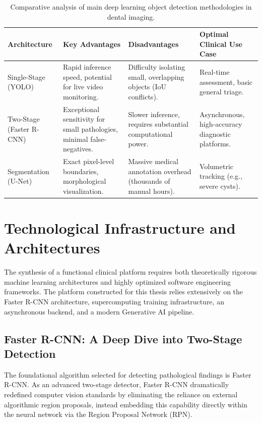 \begin{table}[htbp]
    \centering
    \caption{Comparative analysis of main deep learning object detection methodologies in dental imaging.}
    \vspace{0.2cm}
    \renewcommand{\arraystretch}{1.3}
    \begin{tabular}{|l|>{\raggedright\arraybackslash}p{3.6cm}|>{\raggedright\arraybackslash}p{3.6cm}|>{\raggedright\arraybackslash}p{3.6cm}|}
        \hline
        \textbf{Architecture} & \textbf{Key Advantages} & \textbf{Disadvantages} & \textbf{Optimal Clinical Use Case} \\
        \hline
        Single-Stage (YOLO) & Rapid inference speed, potential for live video monitoring. & Difficulty isolating small, overlapping objects (IoU conflicts). & Real-time assessment, basic general triage. \\
        \hline
        Two-Stage (Faster R-CNN) & Exceptional sensitivity for small pathologies, minimal false-negatives. & Slower inference, requires substantial computational power. & Asynchronous, high-accuracy diagnostic platforms. \\
        \hline
        Segmentation (U-Net) & Exact pixel-level boundaries, morphological visualization. & Massive medical annotation overhead (thousands of manual hours). & Volumetric tracking (e.g., severe cysts). \\
        \hline
    \end{tabular}
    \label{tab:architecture_comparison}
\end{table}

\section{Technological Infrastructure and Architectures}
\label{sec:ch3_technologies}

\par The synthesis of a functional clinical platform requires both theoretically rigorous machine learning architectures and highly optimized software engineering frameworks. The platform constructed for this thesis relies extensively on the Faster R-CNN architecture, supercomputing training infrastructure, an asynchronous backend, and a modern Generative AI pipeline.

\subsection{Faster R-CNN: A Deep Dive into Two-Stage Detection}
\par The foundational algorithm selected for detecting pathological findings is Faster R-CNN. As an advanced two-stage detector, Faster R-CNN dramatically redefined computer vision standards by eliminating the reliance on external algorithmic region proposals, instead embedding this capability directly within the neural network via the Region Proposal Network (RPN).

